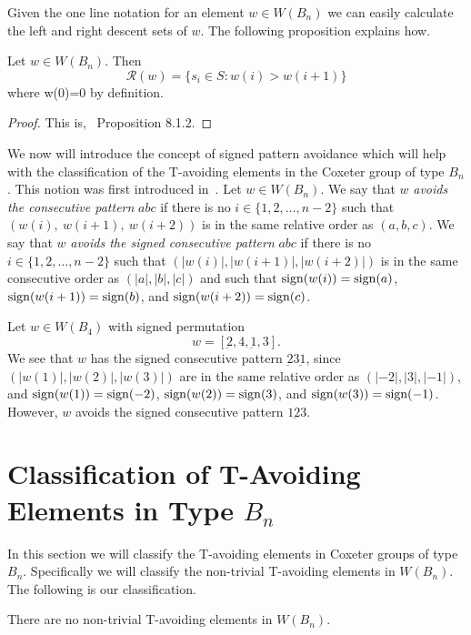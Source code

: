 Given the one line notation for an element $w \in W(B_n)$ we can easily calculate the left and right descent sets of $w$. The following proposition explains how.

\begin{proposition}\label{prop:descent}
Let $w \in W(B_n)$. Then 
\[ \mathcal{R}(w)=\{s_i \in S: w(i) > w(i+1)\} \]
where w(0)=0 by definition.
\begin{proof}
	This is,~\cite{Bjorner2005} Proposition 8.1.2.
\end{proof}
\end{proposition}

We now will introduce the concept of signed pattern avoidance which will help with the classification of the T-avoiding elements in the Coxeter group of type $B_n$. This notion was first introduced in~\cite{Gern2013a}. Let $w \in W(B_n)$. We say that $w$ \emph{avoids the consecutive pattern} $abc$ if there is no $i \in \{1,2, \ldots, n-2\}$ such that $(w(i),~w(i+1),~w(i+2))$ is in the same relative order as $(a,b,c).$ We say that $w$ \emph{avoids the signed consecutive pattern} $abc$ if there is no $i \in \{1,2, \ldots, n-2\}$ such that $\left(|w(i)|, |w(i+1)|, |w(i+2)|\right)$ is in the same consecutive order as $\left(|a|, |b|, |c| \right)$ and such that $\mathrm{sign}(w(i))=\mathrm{sign}(a)$, $\mathrm{sign}(w(i+1))=\mathrm{sign}(b)$, and $\mathrm{sign}(w(i+2))=\mathrm{sign}(c)$.

\begin{example}
Let $w \in W(B_4)$ with signed permutation \[w=[\underbar{2},4, \underbar{1}, 3].\] We see that $w$ has the signed consecutive pattern $\underbar{2} 3 \underbar{1}$, since $(|w(1)|, |w(2)|, |w(3)|)$ are in the same relative order as $(|-2|, |3|, |-1|)$, and $\mathrm{sign}(w(1))=\mathrm{sign}(-2)$, $\mathrm{sign}(w(2))=\mathrm{sign}(3)$, and $\mathrm{sign}(w(3))=\mathrm{sign}(-1)$. However, $w$ avoids the signed consecutive pattern $1\underbar{2}3$.
\end{example}

\section{Classification of T-Avoiding Elements in Type $B_n$}\label{sec:TAB}

In this section we will classify the T-avoiding elements in Coxeter groups of type $B_n$. Specifically we will classify the non-trivial T-avoiding elements in $W(B_n)$. The following is our classification.

\begin{theorem}\label{thm:classificationofB}
There are no non-trivial T-avoiding elements in $W(B_n)$.	
\end{theorem}
 
